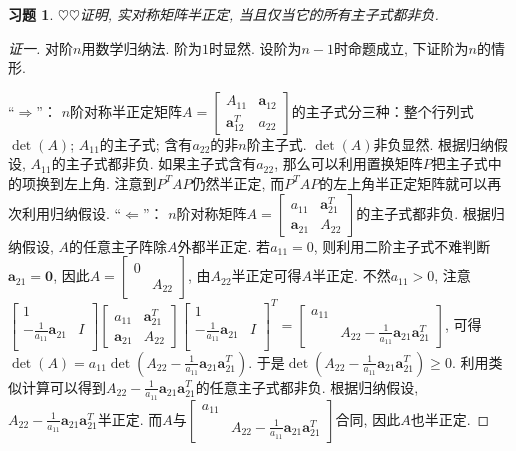 \documentclass{ctexart}
\newtheorem{exercise}[thm]{习题}
\newcommand\bs[1]{\boldsymbol{ #1}}
\newcommand\hint[1]{\par {\footnotesize\kaishu 提示：#1}}
\def\hard{$\heartsuit$}
\begin{document}
\begin{exercise}
\hard\hard 证明, 实对称矩阵半正定, 当且仅当它的所有主子式都非负. 

\end{exercise}
\begin{proof}[证一]
	对阶$n$用数学归纳法. 
	阶为$1$时显然. 设阶为$n-1$时命题成立, 下证阶为$n$的情形. 

	``$\Rightarrow$''：
	$n$阶对称半正定矩阵$A=\begin{bmatrix}
		A_{11} & \bs a_{12}\\
		\bs a_{12}^T & a_{22}
	\end{bmatrix}$的主子式分三种：整个行列式$\det(A)$; 
	$A_{11}$的主子式; 含有$a_{22}$的非$n$阶主子式. 
	$\det(A)$非负显然. 
	根据归纳假设, $A_{11}$的主子式都非负. 如果主子式含有$a_{22}$, 那么可以利用置换矩阵$P$把主子式中的项换到左上角. 注意到$P^TAP$仍然半正定, 而$P^TAP$的左上角半正定矩阵就可以再次利用归纳假设. 
	``$\Leftarrow$''：
$n$阶对称矩阵$A=\begin{bmatrix}
		a_{11} & \bs a_{21}^T\\
		\bs a_{21} & A_{22}
	\end{bmatrix}$的主子式都非负. 根据归纳假设, $A$的任意主子阵除$A$外都半正定. 
	若$a_{11}=0$, 则利用二阶主子式不难判断$\bs a_{21}=\bs 0$, 因此$A=\begin{bmatrix}
		0 & \\ & A_{22}
	\end{bmatrix}$, 由$A_{22}$半正定可得$A$半正定. 
	不然$a_{11}>0$, 注意$\begin{bmatrix}
		1 & \\ -\frac{1}{a_{11}}\bs a_{21} & I\\
	\end{bmatrix}\begin{bmatrix}
		a_{11} & \bs a_{21}^T\\
		\bs a_{21} & A_{22}
	\end{bmatrix}\begin{bmatrix}
		1 & \\ -\frac{1}{a_{11}}\bs a_{21} & I\\
	\end{bmatrix}^T=\begin{bmatrix}
	a_{11} & \\ & A_{22}-\frac{1}{a_{11}}\bs a_{21}\bs a_{21}^T
\end{bmatrix}$, 可得$\det(A)=a_{11}\det(A_{22}-\frac{1}{a_{11}}\bs a_{21}\bs a_{21}^T)$. 
于是$\det(A_{22}-\frac{1}{a_{11}}\bs a_{21}\bs a_{21}^T)\ge0$. 
利用类似计算可以得到$A_{22}-\frac{1}{a_{11}}\bs a_{21}\bs a_{21}^T
$的任意主子式都非负. 根据归纳假设, $A_{22}-\frac{1}{a_{11}}\bs a_{21}\bs a_{21}^T
$半正定. 
而$A$与$\begin{bmatrix}
	a_{11} & \\ & A_{22}-\frac{1}{a_{11}}\bs a_{21}\bs a_{21}^T
\end{bmatrix}$合同, 因此$A$也半正定. 
\end{proof}
\end{document}

